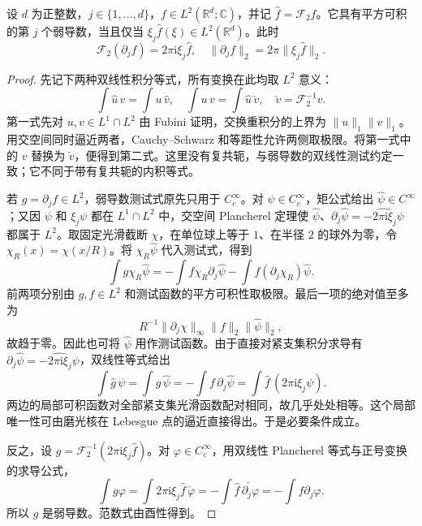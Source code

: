 \begin{theorem}[平方可积弱导数的频率刻画]\label{b2:thm:04-weak-derivative}
设 \(d\) 为正整数，\(j\in\{1,\ldots,d\}\)，\(f\in L^2(\mathbb R^d;\mathbb C)\)，并记 \(\widehat f=\mathcal F_2f\)。它具有平方可积的第 \(j\) 个弱导数，当且仅当 \(\xi_j\widehat f(\xi)\in L^2(\mathbb R^d)\)。此时
\[
 \mathcal F_2(\partial_jf)=2\pi\mathrm{i}\xi_j\widehat f,
 \quad\|\partial_jf\|_2=2\pi\|\xi_j\widehat f\|_2.
\]
\end{theorem}
\begin{proof}
先记下两种双线性积分等式，所有变换在此均取 \(L^2\) 意义：
\[
 \int\widehat u\,v=\int u\,\widehat v,
 \quad \int u\,v=\int\widehat u\,\check v,
 \quad \check v=\mathcal F_2^{-1}v.
\]
第一式先对 \(u,v\in L^1\cap L^2\) 由 Fubini 证明，交换重积分的上界为 \(\|u\|_1\|v\|_1\)。用交空间同时逼近两者，Cauchy--Schwarz 和等距性允许两侧取极限。将第一式中的 \(v\) 替换为 \(\check v\)，便得到第二式。这里没有复共轭，与弱导数的双线性测试约定一致；它不同于带有复共轭的内积等式。

若 \(g=\partial_jf\in L^2\)，弱导数测试式原先只用于 \(C_c^\infty\)。对 \(\psi\in C_c^\infty\)，矩公式给出 \(\widehat\psi\in C^\infty\)；又因 \(\psi\) 和 \(\xi_j\psi\) 都在 \(L^1\cap L^2\) 中，交空间 Plancherel 定理使 \(\widehat\psi\)、\(\partial_j\widehat\psi=\widehat{-2\pi\mathrm i\xi_j\psi}\) 都属于 \(L^2\)。取固定光滑截断 \(\chi\)，在单位球上等于 \(1\)、在半径 \(2\) 的球外为零，令 \(\chi_R(x)=\chi(x/R)\)。将 \(\chi_R\widehat\psi\) 代入测试式，得到
\[
 \int g\chi_R\widehat\psi
 =-\int f\chi_R\partial_j\widehat\psi
   -\int f(\partial_j\chi_R)\widehat\psi.
\]
前两项分别由 \(g,f\in L^2\) 和测试函数的平方可积性取极限。最后一项的绝对值至多为
\[
 R^{-1}\|\partial_j\chi\|_\infty\|f\|_2\|\widehat\psi\|_2,
\]
故趋于零。因此也可将 \(\widehat\psi\) 用作测试函数。由于直接对紧支集积分求导有 \(\partial_j\widehat\psi=\widehat{-2\pi\mathrm{i}\xi_j\psi}\)，双线性等式给出
\[
 \int\widehat g\,\psi
 =\int g\,\widehat\psi
 =-\int f\,\partial_j\widehat\psi
 =\int\widehat f\,(2\pi\mathrm{i}\xi_j\psi).
\]
两边的局部可积函数对全部紧支集光滑函数配对相同，故几乎处处相等。这个局部唯一性可由磨光核在 Lebesgue 点的逼近直接得出。于是必要条件成立。

反之，设 \(g=\mathcal F_2^{-1}(2\pi\mathrm{i}\xi_j\widehat f)\)。对 \(\varphi\in C_c^\infty\)，用双线性 Plancherel 等式与正号变换的求导公式，
\[
 \int g\varphi
 =\int2\pi\mathrm{i}\xi_j\widehat f\,\check\varphi
 =-\int\widehat f\,\check{\partial_j\varphi}
 =-\int f\partial_j\varphi.
\]
所以 \(g\) 是弱导数。范数式由酉性得到。
\end{proof}

